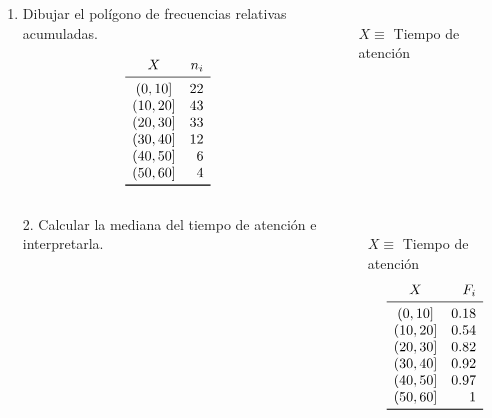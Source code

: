 \documentclass[aspectratio=149,10pt,t]{beamer}
\begin{document}
\begin{frame}
	\begin{columns}
		\begin{column}[T]{0.7\textwidth}
			\begin{enumerate}
			  \item Dibujar el polígono de frecuencias relativas acumuladas.
			\end{enumerate}
			\[
			\begin{array}{cr}
				X & n_i\\
				\midrule
				(0,10] & 22\\
				(10,20] & 43\\
				(20,30] & 33\\
				(30,40] & 12\\
				(40,50] & 6\\
				(50,60] & 4\\
				\bottomrule
			\end{array}
			\]
		\end{column}
		\begin{column}[T]{0.3\textwidth}
			\\
			$X\equiv$ Tiempo de atención\\
		\end{column}
	\end{columns}
\end{frame}


\begin{frame}
	\begin{columns}
		\begin{column}[T]{0.7\textwidth}
			\begin{enumerate}
			  \item[2.] Calcular la mediana del tiempo de atención e interpretarla.
			\end{enumerate}
		\end{column}
		\begin{column}[T]{0.3\textwidth}
			\structure{Datos}\\
			$X\equiv$ Tiempo de atención\\
			\[
			\begin{array}{cr}
				X & F_i\\
				\midrule
				(0,10] & 0.18\\
				(10,20] & 0.54\\
				(20,30] & 0.82\\
				(30,40] & 0.92\\
				(40,50] & 0.97\\
				(50,60] & 1\\
				\bottomrule
			\end{array}
			\]
		\end{column}
	\end{columns}
\end{frame}
\end{document}
